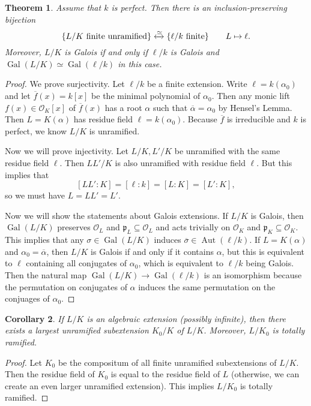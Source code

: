 \documentclass[leqno, openany]{memoir}
\newtheorem{thm}{Theorem}[section]
\newtheorem{cor}[thm]{Corollary}
\theoremstyle{definition}
\theoremstyle{remark}
\theoremstyle{plain}
\theoremstyle{definition}
\theoremstyle{remark}
\newcommand{\mc}[1]{\mathcal{#1}}
\newcommand{\mf}[1]{\mathfrak{#1}}
\newcommand{\ol}[1]{\overline{#1}}
\DeclareMathOperator{\Aut}{Aut}
\DeclareMathOperator{\Gal}{Gal}
\begin{document}
\begin{thm} Assume that $k$ is perfect. Then there is an inclusion-preserving
    bijection \[ \qty{L/K\ \text{finite unramified}} \xleftrightarrow{\simeq}
    \qty{\ell / k\ \text{finite}} \qquad L \mapsto \ell. \] Moreover, $L/K$ is
    Galois if and only if $\ell/k$ is Galois and $\Gal(L/K) \simeq
    \Gal(\ell/k)$ in this case.  \end{thm}

\begin{proof} We prove surjectivity. Let $\ell / k$ be a finite extension.
    Write $\ell = k(\alpha_0)$ and let $\ol{f}(x) = k[x]$ be the minimal
    polynomial of $\alpha_0$. Then any monic lift $f(x) \in \mc{O}_K[x]$ of
    $\ol{f}(x)$ has a root $\alpha$ such that $\ol{\alpha} = \alpha_0$ by
    Hensel's Lemma. Then $L = K(\alpha)$ has residue field $\ell =
    k(\alpha_0)$. Because $\ol{f}$ is irreducible and $k$ is perfect, we know
    $L/K$ is unramified.

    Now we will prove injectivity. Let $L/K, L'/K$ be unramified with the same
    residue field $\ell$. Then $LL'/K$ is also unramified with residue field
    $\ell$. But this implies that \[ [LL' : K] = [\ell : k] = [L : K] = [L' :
    K], \] so we must have $L = LL' = L'$.
    
    Now we will show the statements about Galois extensions. If $L/K$ is
Galois, then $\Gal(L/K)$ preserves $\mc{O}_L$ and $\mf{p}_L \subseteq \mc{O}_L$
and acts trivially on $\mc{O}_K$ and $\mf{p}_K \subseteq \mc{O}_K$. This
implies that any $\sigma \in \Gal(L/K)$ induces $\ol{\sigma} \in \Aut(\ell/k)$.
If $L = K(\alpha)$ and $\alpha_0 = \ol{\alpha}$, then $L/K$ is Galois if and
only if it contains $\alpha$, but this is equivalent to $\ell$ containing all
conjugates of $\alpha_0$, which is equivalent to $\ell/k$ being Galois. Then
the natural map $\Gal(L/K) \to \Gal(\ell / k)$ is an isomorphism because the
permutation on conjugates of $\alpha$ induces the same permutation on the
conjuages of $\alpha_0$.  \end{proof}

\begin{cor} If $L/K$ is an algebraic extension (possibly infinite), then there
exists a largest unramified subextension $K_0 / K$ of $L/K$. Moreover, $L/K_0$
is totally ramified.  \end{cor}

\begin{proof} Let $K_0$ be the compositum of all finite unramified
    subextensions of $L/K$. Then the residue field of $K_0$ is equal to the
    residue field of $L$ (otherwise, we can create an even larger unramified
    extension). This implies $L/K_0$ is totally ramified.  \end{proof}
\end{document}
